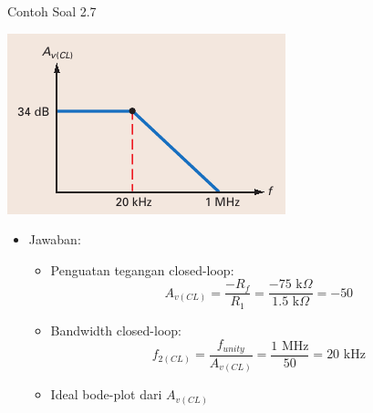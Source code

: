 \begin{frame}{Contoh Soal 2.7}
	\begin{multicols}{2}
		\begin{center}
			\includegraphics[width=\linewidth]{gambar/fig-16.16b}
		\end{center}
		\columnbreak
		\begin{itemize}
			\item Jawaban:
			\begin{itemize}
				\item Penguatan tegangan closed-loop:
				\[ A_{v(CL)} = \frac{-R_f}{R_1} = \frac{-75 \text{ k}\Omega}{1.5 \text{ k}\Omega} = -50\]
				\item Bandwidth closed-loop:
				\[ f_{2(CL)} = \frac{f_{unity}}{A_{v(CL)}} = \frac{1 \text{ MHz}}{50} = 20 \text{ kHz}\]
				\item Ideal bode-plot dari $ A_{v(CL)} $
			\end{itemize}
		\end{itemize}
	\end{multicols}
\end{frame}

